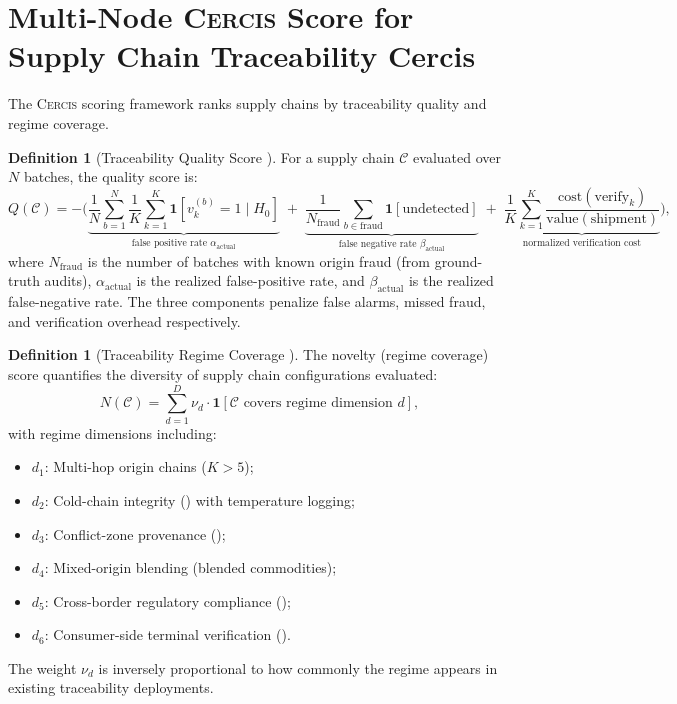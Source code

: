 \documentclass[11pt,a4paper]{article}
\theoremstyle{definition}
\newtheorem{definition}[theorem]{Definition}
\theoremstyle{remark}
\newcommand{\Cercis}{\textsc{Cercis}}
\newcommand{\ind}[1]{\mathbf{1}[#1]}
\newcommand{\chain}{\mathcal{C}}
\begin{document}
\section{Multi-Node \Cercis{} Score for Supply Chain Traceability Cercis}
\label{sec:cercis}

The \Cercis{} scoring framework ranks supply chains by traceability quality and regime coverage.

\begin{definition}[Traceability Quality Score ]
\label{def:traceability_Q}
For a supply chain $\chain$ evaluated over $N$ batches, the quality score is:
\begin{equation}
    Q(\chain) = -\Bigg(
        \underbrace{\frac{1}{N}\sum_{b=1}^{N} \frac{1}{K}\sum_{k=1}^{K} \ind{v_k^{(b)} = 1 \mid H_0}}_{\text{false positive rate } \alpha_{\text{actual}}}
        \;+\;
        \underbrace{\frac{1}{N_{\text{fraud}}}\sum_{b \in \text{fraud}} \ind{\text{undetected}}}_{\text{false negative rate } \beta_{\text{actual}}}
        \;+\;
        \underbrace{\frac{1}{K}\sum_{k=1}^{K} \frac{\text{cost}(\text{verify}_k)}{\text{value}(\text{shipment})}}_{\text{normalized verification cost}}
    \Bigg),
    \label{eq:traceability_Q}
\end{equation}
where $N_{\text{fraud}}$ is the number of batches with known origin fraud (from ground-truth audits), $\alpha_{\text{actual}}$ is the realized false-positive rate, and $\beta_{\text{actual}}$ is the realized false-negative rate. The three components penalize false alarms, missed fraud, and verification overhead respectively.
\end{definition}

\begin{definition}[Traceability Regime Coverage ]
\label{def:traceability_N}
The novelty (regime coverage) score quantifies the diversity of supply chain configurations evaluated:
\begin{equation}
    N(\chain) = \sum_{d=1}^{D} \nu_d \cdot \ind{\chain \text{ covers regime dimension } d},
    \label{eq:traceability_N}
\end{equation}
with regime dimensions including:
\begin{itemize}
    \item $d_1$: Multi-hop origin chains ($K > 5$);
    \item $d_2$: Cold-chain integrity () with temperature logging;
    \item $d_3$: Conflict-zone provenance ();
    \item $d_4$: Mixed-origin blending (blended commodities);
    \item $d_5$: Cross-border regulatory compliance ();
    \item $d_6$: Consumer-side terminal verification ().
\end{itemize}
The weight $\nu_d$ is inversely proportional to how commonly the regime appears in existing traceability deployments.
\end{definition}
\end{document}
